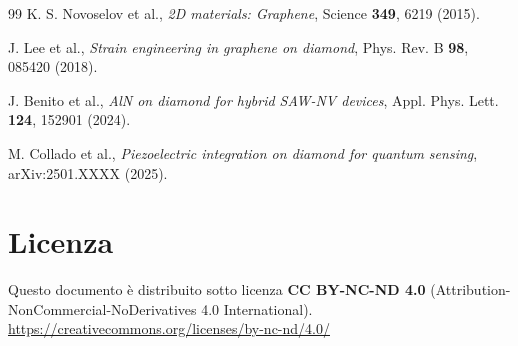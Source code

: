 \documentclass[12pt,a4paper]{article}
\begin{document}
\begin{thebibliography}{99}
K. S. Novoselov et al., \textit{2D materials: Graphene}, Science \textbf{349}, 6219 (2015).

J. Lee et al., \textit{Strain engineering in graphene on diamond}, Phys. Rev. B \textbf{98}, 085420 (2018).

J. Benito et al., \textit{AlN on diamond for hybrid SAW-NV devices}, Appl. Phys. Lett. \textbf{124}, 152901 (2024).

M. Collado et al., \textit{Piezoelectric integration on diamond for quantum sensing}, arXiv:2501.XXXX (2025).

\end{thebibliography}


\vspace{1cm}



\section{Licenza}
Questo documento è distribuito sotto licenza \textbf{CC BY-NC-ND 4.0} (Attribution-NonCommercial-NoDerivatives 4.0 International).  
\url{https://creativecommons.org/licenses/by-nc-nd/4.0/}
\end{document}
